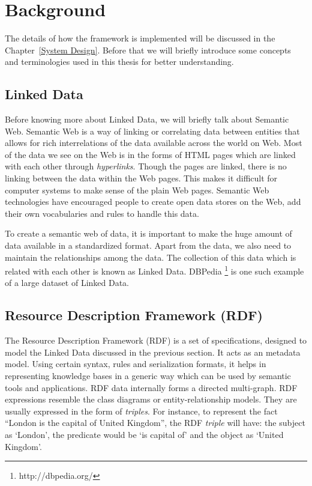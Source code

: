 \section{Background}
The details of how the framework is implemented will be discussed in the Chapter~\ref{System Design}. Before that we will briefly introduce some concepts and terminologies used in this thesis for better understanding.

\subsection{Linked Data}

Before knowing more about Linked Data, we will briefly talk about Semantic Web. Semantic Web is a way of linking or correlating data between entities that allows for rich interrelations of the data available across the world on Web. Most of the data we see on the Web is in the forms of HTML pages which are linked with each other through \textit{hyperlinks}. Though the pages are linked, there is no linking between the data within the Web pages. This makes it difficult for computer systems to make sense of the plain Web pages. Semantic Web technologies have encouraged people to create open data stores on the Web, add their own vocabularies and rules to handle this data.

To create a semantic web of data, it is important to make the huge amount of data available in a standardized format. Apart from the data, we also need to maintain the relationships among the data. The collection of this data which is related with each other is known as Linked Data. DBPedia \footnote{http://dbpedia.org/} is one such example of a large dataset of Linked Data.

\subsection{Resource Description Framework (RDF)}

The Resource Description Framework (RDF) is a set of specifications, designed to model the Linked Data discussed in the previous section. It acts as an metadata model. Using certain syntax, rules and serialization formats, it helps in representing knowledge bases in a generic way which can be used by semantic tools and applications. RDF data internally forms a directed multi-graph. RDF expressions resemble the class diagrams or entity-relationship models. They are usually expressed in the form of \textit{triples}. For instance, to represent the fact ``London is the capital of United Kingdom'', the RDF \textit{triple} will have: the subject as `London', the predicate would be `is capital of' and the object as `United Kingdom'.

